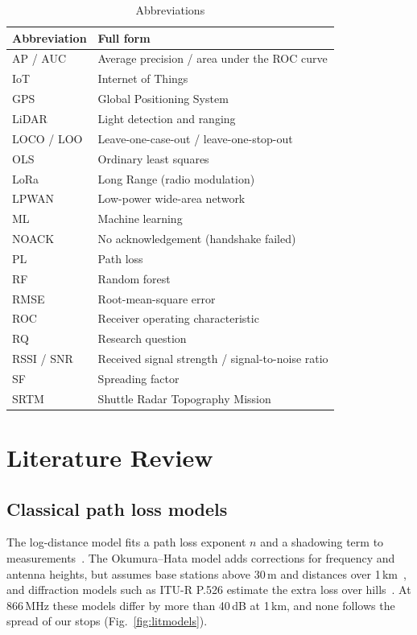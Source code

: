 \documentclass[conference]{IEEEtran}
\newcommand{\dB}{\,dB\xspace}
\begin{document}
\begin{table}[t]
\caption{Abbreviations}\label{tab:abbr}
\centering
\footnotesize
\setlength{\tabcolsep}{4pt}
\begin{tabular}{@{}ll@{}}
\toprule
Abbreviation & Full form \\
\midrule
AP / AUC & Average precision / area under the ROC curve \\
IoT & Internet of Things \\
GPS & Global Positioning System \\
LiDAR & Light detection and ranging \\
LOCO / LOO & Leave-one-case-out / leave-one-stop-out \\
OLS & Ordinary least squares \\
LoRa & Long Range (radio modulation) \\
LPWAN & Low-power wide-area network \\
ML & Machine learning \\
NOACK & No acknowledgement (handshake failed) \\
PL & Path loss \\
RF & Random forest \\
RMSE & Root-mean-square error \\
ROC & Receiver operating characteristic \\
RQ & Research question \\
RSSI / SNR & Received signal strength / signal-to-noise ratio \\
SF & Spreading factor \\
SRTM & Shuttle Radar Topography Mission \\
\bottomrule
\end{tabular}
\end{table}

\section{Literature Review}\label{sec:related}

\subsection{Classical path loss models}
The log-distance model fits a path loss exponent $n$ and a shadowing term to measurements~\cite{rappaport2002}. The Okumura--Hata model adds corrections for frequency and antenna heights, but assumes base stations above 30\,m and distances over 1\,km~\cite{hata1980}, and diffraction models such as ITU-R P.526 estimate the extra loss over hills~\cite{itu_p526}. At 866\,MHz these models differ by more than 40\dB at 1\,km, and none follows the spread of our stops (Fig.~\ref{fig:litmodels}).
\end{document}
